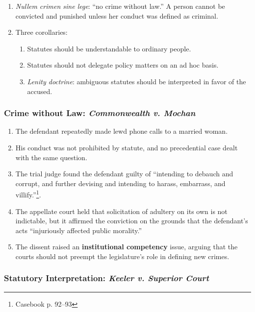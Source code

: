\begin{enumerate}
    \item \emph{Nullem crimen sine lege}: ``no crime without law.'' A person cannot be convicted and punished unless her conduct was defined as criminal.
    \item Three corollaries:
    \begin{enumerate}
        \item Statutes should be understandable to ordinary people.
        \item Statutes should not delegate policy matters on an ad hoc basis.
        \item \emph{Lenity doctrine}: ambiguous statutes should be interpreted in favor of the accused.
    \end{enumerate}
\end{enumerate}

\subsubsection{Crime without Law: \emph{Commonwealth v. Mochan}}

\begin{enumerate}
    \item The defendant repeatedly made lewd phone calls to a married woman.
    \item His conduct was not prohibited by statute, and no precedential case dealt with the same question.
    \item The trial judge found the defendant guilty of ``intending to debauch and corrupt, and further devising and intending to harass, embarrass, and villify.''\footnote{Casebook p. 92--93}.
    \item The appellate court held that solicitation of adultery on its own is not indictable, but it affirmed the conviction on the grounds that the defendant's acts ``injuriously affected public morality.''
    \item The dissent raised an \textbf{institutional competency} issue, arguing that the courts should not preempt the legislature's role in defining new crimes.
\end{enumerate}

\subsubsection{Statutory Interpretation: \emph{Keeler v. Superior Court}}

